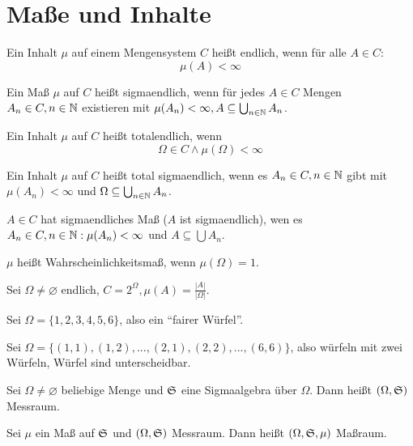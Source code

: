 	\section{Maße und Inhalte}
		\begin{defi}
			Ein Inhalt $\mu$ auf einem Mengensystem $C$ heißt endlich, wenn für alle $A\in C$:
			\[ \mu(A)<\infty \]
		\end{defi}
		\begin{defi}
			Ein Maß $\mu$ auf $C$ heißt sigmaendlich, wenn für jedes $A\in C$ Mengen $A_n\in C, n\in \mathbb{N}$ existieren mit $\mu(A_n)<\infty, A\subseteq \bigcup_{n\in\mathbb{N}} A_n$.
		\end{defi}
		\begin{defi}
			Ein Inhalt $\mu$ auf $C$ heißt totalendlich, wenn
			\[ \Omega\in C\land \mu(\Omega)<\infty \]
		\end{defi}
		\begin{defi}
			Ein Inhalt $\mu$ auf $C$ heißt total sigmaendlich, wenn es $A_n\in C, n\in \mathbb{N}$ gibt mit $\mu(A_n)<\infty$ und $\Omega\subseteq \bigcup_{n\in \mathbb{N}} A_n$. 
		\end{defi}
		\begin{defi}
			$A\in C$ hat sigmaendliches Maß ($A$ ist sigmaendlich), wen es $A_n\in C, n\in\mathbb{N}: \mu(A_n)<\infty$ und $A\subseteq \bigcup A_n$. 
		\end{defi}
		\begin{defi}
			$\mu$ heißt Wahrscheinlichkeitsmaß, wenn $\mu(\Omega)=1$.
		\end{defi}
		\begin{bsp}
			Sei $\Omega\neq\varnothing$ endlich, $C=2^\Omega, \mu(A)=\frac{|A|}{|\Omega|}$.
		\end{bsp}
		\begin{bsp}
			Sei $\Omega=\{1,2,3,4,5,6\}$, also ein "`fairer Würfel"'.
			\end{bsp}
		\begin{bsp}
			Sei $\Omega=\{(1,1), (1,2),...,(2,1),(2,2),...,(6,6)\}$, also würfeln mit zwei Würfeln, Würfel sind unterscheidbar. 
		\end{bsp}
		\begin{defi}
			Sei $\Omega\neq\varnothing$ beliebige Menge und $\mathfrak{S}$ eine Sigmaalgebra über $\Omega$. Dann heißt $(\Omega, \mathfrak{S})$ Messraum. 
		\end{defi}
		\begin{defi}
			Sei $\mu$ ein Maß auf $\mathfrak{S}$ und $(\Omega, \mathfrak{S})$ Messraum. Dann heißt $(\Omega, \mathfrak{S}, \mu)$ Maßraum. 
		\end{defi}
